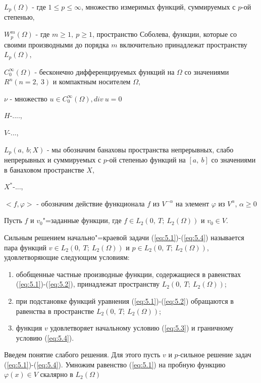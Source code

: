$L_p(\Omega)$ - где $1\leqslant p\leqslant\infty$, множество измеримых функций, суммируемых с $p$-ой степенью,

$W_p^m(\Omega)$ - где $m\geqslant 1, \ p\geqslant 1$, пространство Соболева,
функции, которые со своими производными до порядка $m$ включительно принадлежат пространству $L_p(\Omega)$,

$C_0^{\infty}(\Omega)$ - бесконечно дифференцируемых функций на $\Omega$ со значениями $R^n(n=2, \ 3)$ и компактным носителем $\Omega$,

$\nu$ - множество ${u\in C_0^{\infty}(\Omega), div \ u=0}$

$H$-....,

$V$-...,

$L_p(a, \ b;X)$ - мы обозначим банаховы пространства непрерывных, слабо непрерывных и суммируемых с $p$-ой степенью функций на $[a, \ b]$ со значениями в
банаховом пространстве $X$,

$X^*$-...,

$<f,\varphi>$ - обозначим действие функционала $f$ из $V^{-\alpha}$ на элемент $\varphi$ из $V^{\alpha}$, $\alpha\geqslant 0$

Пусть $f$ и $v_0$"=заданные функции,
где $f\in L_2(0, \ T; \ L_2(\Omega))$ и $v_0\in V$.

\begin{definition}
    Сильным решением начально"=краевой задачи (\ref{eq:5.1})-(\ref{eq:5.4}) называется пара функций $v\in L_2(0, \ T; \ L_2(\Omega))$ и
    $p\in L_2(0, \ T; \ L_2(\Omega))$, удовлетворяющие следующим условиям:
\end{definition}

\begin{enumerate} 
    \item обобщенные частные производные функции, содержащиеся в равенствах (\ref{eq:5.1})-(\ref{eq:5.2}), принадлежат пространству $L_2(0, \ T; \ L_2(\Omega))$;
    \item при подстановке функций уравнения (\ref{eq:5.1})-(\ref{eq:5.2}) обращаются в равенства в пространстве $L_2(0, \ T; \ L_2(\Omega))$;
    \item функция $v$ удовлетворяет начальному условию (\ref{eq:5.3}) и граничному условию (\ref{eq:5.4}).
\end{enumerate}

Введем понятие слабого решения. Для этого пусть $v$ и $p$-сильное решение задач (\ref{eq:5.1})-(\ref{eq:5.4}).
Умножим равенство (\ref{eq:5.1}) на пробную функцию $\varphi (x)\in V$ скалярно в $L_2(\Omega)$


